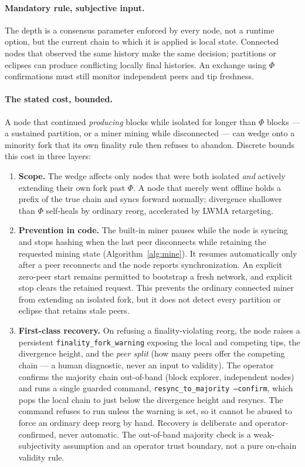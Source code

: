\documentclass[11pt,a4paper]{article}
\newcommand{\code}[1]{\texttt{\small #1}}
\begin{document}
\paragraph{Mandatory rule, subjective input.} The depth is a consensus
parameter enforced by every node, not a runtime option, but the current chain
to which it is applied is local state. Connected nodes that observed the same
history make the same decision; partitions or eclipses can produce conflicting
locally final histories. An exchange using $\Phi$ confirmations must still
monitor independent peers and tip freshness.

\paragraph{The stated cost, bounded.} A node that continued \emph{producing}
blocks while isolated for longer than $\Phi$ blocks --- a sustained partition,
or a miner mining while disconnected --- can wedge onto a minority fork that
its own finality rule then refuses to abandon. Discrete bounds this cost in
three layers:

\begin{enumerate}
\item \textbf{Scope.} The wedge affects only nodes that were both isolated
  \emph{and} actively extending their own fork past $\Phi$. A node that
  merely went offline holds a prefix of the true chain and syncs forward
  normally; divergence shallower than $\Phi$ self-heals by ordinary reorg,
  accelerated by LWMA retargeting.
\item \textbf{Prevention in code.} The built-in miner pauses while the node is
  syncing and stops hashing when the last peer disconnects while retaining the
  requested mining state (Algorithm~\ref{alg:mine}). It resumes automatically
  only after a peer reconnects and the node reports synchronization. An explicit
  zero-peer start remains permitted to bootstrap a fresh network, and explicit
  stop clears the retained request. This prevents the ordinary connected miner
  from extending an isolated fork, but it does not detect every partition or
  eclipse that retains stale peers.
\item \textbf{First-class recovery.} On refusing a finality-violating reorg,
  the node raises a persistent \code{finality\_fork\_warning} exposing the
  local and competing tips, the divergence height, and the \emph{peer split}
  (how many peers offer the competing chain --- a human diagnostic, never an
  input to validity). The operator confirms the majority chain out-of-band
  (block explorer, independent nodes) and runs a single guarded command,
  \code{resync\_to\_majority --confirm}, which pops the local chain to just
  below the divergence height and resyncs. The command refuses to run unless
  the warning is set, so it cannot be abused to force an ordinary deep reorg
  by hand. Recovery is deliberate and operator-confirmed, never automatic.
  The out-of-band majority check is a weak-subjectivity assumption and an
  operator trust boundary, not a pure on-chain validity rule.
\end{enumerate}
\end{document}
